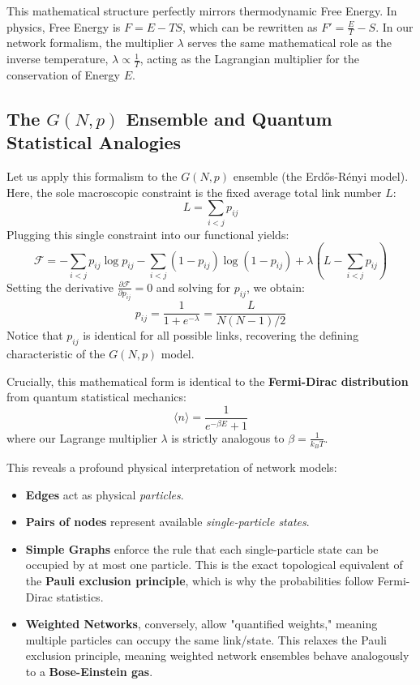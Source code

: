 This mathematical structure perfectly mirrors thermodynamic Free Energy. In physics, Free Energy is \(F = E - TS\), which can be rewritten as \(F' = \frac{E}{T} - S\). In our network formalism, the multiplier \(\lambda\) serves the same mathematical role as the inverse temperature, \(\lambda \propto \frac{1}{T}\), acting as the Lagrangian multiplier for the conservation of Energy \(E\).

\subsection{The \(G(N,p)\) Ensemble and Quantum Statistical Analogies}
\label{subsec:gnp_ensemble_analogies}

Let us apply this formalism to the \(G(N,p)\) ensemble (the Erdős-Rényi model). Here, the sole macroscopic constraint is the fixed average total link number \(L\):
\[
    L = \sum_{i<j} p_{ij}
\]
Plugging this single constraint into our functional yields:
\[
    \mathcal{F} = - \sum_{i<j} p_{ij} \log p_{ij} - \sum_{i<j} (1 - p_{ij}) \log(1 - p_{ij}) + \lambda \left( L - \sum_{i<j} p_{ij} \right)
\]
Setting the derivative \(\frac{\partial \mathcal{F}}{\partial p_{ij}} = 0\) and solving for \(p_{ij}\), we obtain:
\[
    p_{ij} = \frac{1}{1 + e^{-\lambda}} = \frac{L}{N(N-1)/2}
\]
Notice that \(p_{ij}\) is identical for all possible links, recovering the defining characteristic of the \(G(N,p)\) model.

Crucially, this mathematical form is identical to the \textbf{Fermi-Dirac distribution} from quantum statistical mechanics:
\[
    \langle n \rangle = \frac{1}{e^{-\beta E} + 1}
\]
where our Lagrange multiplier \(\lambda\) is strictly analogous to \(\beta = \frac{1}{k_B T}\).

This reveals a profound physical interpretation of network models:
\begin{itemize}
    \item \textbf{Edges} act as physical \textit{particles}.
    \item \textbf{Pairs of nodes} represent available \textit{single-particle states}.
    \item \textbf{Simple Graphs} enforce the rule that each single-particle state can be occupied by at most one particle. This is the exact topological equivalent of the \textbf{Pauli exclusion principle}, which is why the probabilities follow Fermi-Dirac statistics.
    \item \textbf{Weighted Networks}, conversely, allow "quantified weights," meaning multiple particles can occupy the same link/state. This relaxes the Pauli exclusion principle, meaning weighted network ensembles behave analogously to a \textbf{Bose-Einstein gas}.
\end{itemize}

